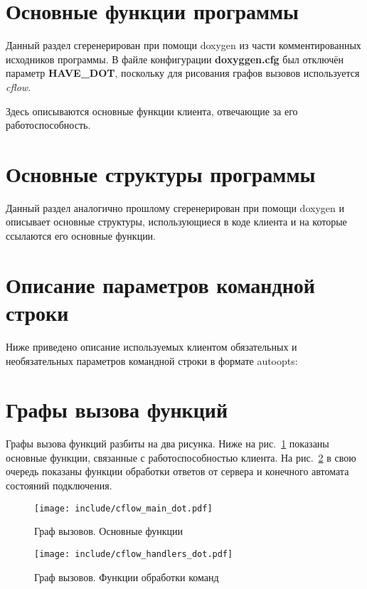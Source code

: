 \documentclass[a4paper,12pt]{report}
\begin{document}
\section{Основные функции программы}

Данный раздел сгеренерирован при помощи doxygen из части комментированных исходников программы. В файле конфигурации \textbf{doxyggen.cfg} был отключён параметр \textbf{HAVE\_DOT}, поскольку для рисования графов вызовов используется \textit{cflow}.

Здесь описываются основные функции клиента, отвечающие за его работоспособность.




\section{Основные структуры программы}

Данный раздел аналогично прошлому сгеренерирован при помощи doxygen и описывает основные структуры, использующиеся в коде клиента и на которые ссылаются его основные функции.






\section{Описание параметров командной строки}

Ниже приведено описание используемых клиентом обязательных и необязательных параметров командной строки в формате autoopts:



\section{Графы вызова функций}

Графы вызова функций разбиты на два рисунка. Ниже на рис.~\ref{fig:cflow1} показаны основные функции, связанные с работоспособностью клиента. На рис.~\ref{fig:cflow2} в свою очередь показаны функции обработки ответов от сервера и конечного автомата состояний подключения.

\begin{figure}[h]
\texttt{[image: include/cflow\_main\_dot.pdf]}
\caption{Граф вызовов. Основные функции}
\label{fig:cflow1}
\end{figure}

\begin{figure}
\centering
\texttt{[image: include/cflow\_handlers\_dot.pdf]}
\caption{Граф вызовов. Функции обработки команд}
\label{fig:cflow2}
\end{figure}
\end{document}
